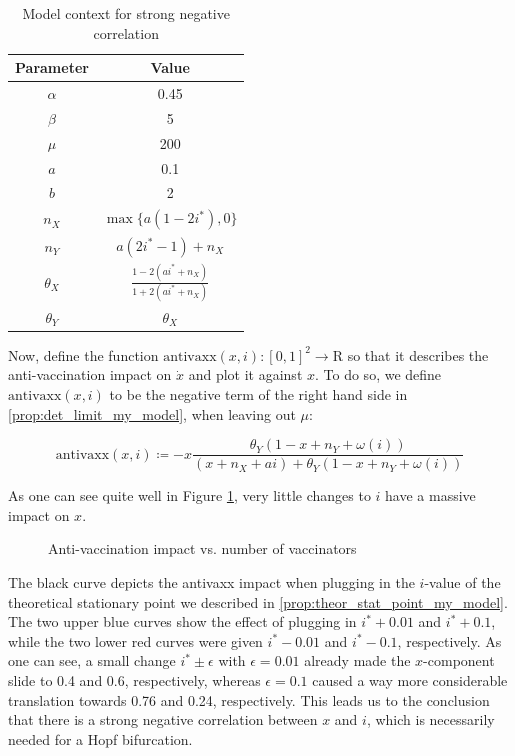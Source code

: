 \documentclass[12pt,a4paper,twoside]{article}
\begin{document}
\begin{table}[h!]
	\centering
	\begin{tabular}{c|c}
		Parameter & Value \\
		\hline
		$\alpha$&0.45\\
		$\beta$&5\\
		$\mu$&200\\
		$a$&0.1\\
		$b$&2\\
		$n_X$&$\max \lbrace a\left(1-2i^*\right), 0\rbrace$\\
		$n_Y$&$a\left(2i^* - 1\right) + n_X$\\
		$\theta_X$&$\frac{1-2\left(ai^* + n_X\right)}{1+2\left(ai^* + n_X\right)}$\\
		$\theta_Y$& $\theta_X$\\
	\end{tabular}
	\caption{Model context for strong negative correlation}
	\label{table:alu_vs_x_params}
\end{table}

Now, define the function $\mathrm{antivaxx}\left(x,i\right): \left[0,1\right]^2 \rightarrow \mathrm{R}$ so that it describes the anti-vaccination impact on $\dot{x}$ and plot it against $x$. To do so, we define $\mathrm{antivaxx}\left(x,i\right)$ to be the negative term of the right hand side in \eqref{prop:det_limit_my_model}, when leaving out $\mu$:

\begin{equation*}
\mathrm{antivaxx}\left(x,i\right) \coloneqq -x\frac{\theta_Y(1-x+n_Y+\omega\left(i\right))}{(x+n_X+ai) + \theta_Y(1-x+n_Y+\omega\left(i\right))}
\end{equation*}

 As one can see quite well in Figure \ref{fig:alu_vs_x}, very little changes to $i$ have a massive impact on $x$.

\begin{figure}[h!]
	\centering
	\caption{Anti-vaccination impact vs. number of vaccinators}
	\label{fig:alu_vs_x}
	\def\svgwidth{350pt}
	
\end{figure}

The black curve depicts the antivaxx impact when plugging in the $i$-value of the theoretical stationary point we described in \eqref{prop:theor_stat_point_my_model}. The two upper blue curves show the effect of plugging in $i^* + 0.01$ and $i^* + 0.1$, while the two lower red curves were given $i^* - 0.01$ and $i^* - 0.1$, respectively. As one can see, a small change $i^* \pm \epsilon$ with $\epsilon = 0.01$ already made the $x$-component slide to 0.4 and 0.6, respectively, whereas $\epsilon = 0.1$ caused a way more considerable translation towards
0.76 and 0.24, respectively. This leads us to the conclusion that there is a strong negative correlation between $x$ and $i$, which is necessarily needed for a Hopf bifurcation.
\end{document}
